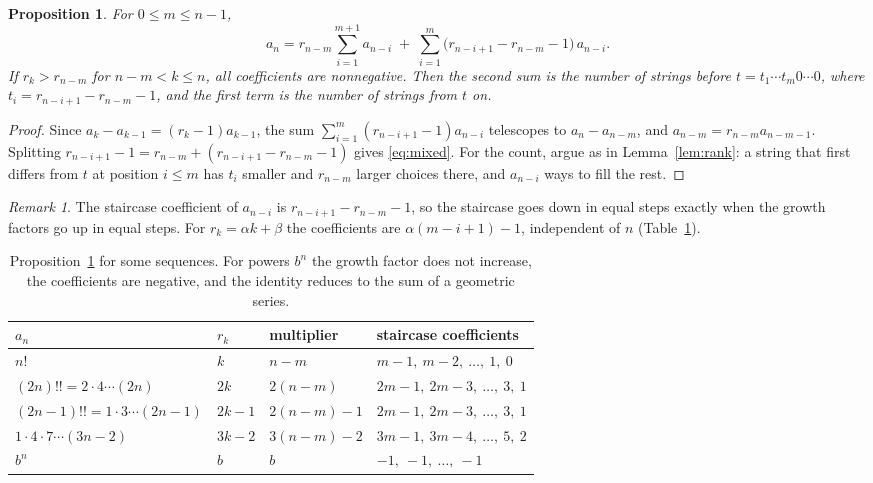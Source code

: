 \documentclass[11pt]{amsart}
\theoremstyle{plain}
\newtheorem{proposition}[theorem]{Proposition}
\theoremstyle{definition}
\theoremstyle{remark}
\newtheorem{remark}[theorem]{Remark}
\begin{document}
\begin{proposition}\label{thm:mixed}
For $0\le m\le n-1$,
\begin{equation}\label{eq:mixed}
  a_n=r_{n-m}\sum_{i=1}^{m+1}a_{n-i}\;+\;
  \sum_{i=1}^{m}\bigl(r_{n-i+1}-r_{n-m}-1\bigr)\,a_{n-i}.
\end{equation}
If $r_k>r_{n-m}$ for $n-m<k\le n$, all coefficients are nonnegative. Then the
second sum is the number of strings before $t=t_1\cdots t_m0\cdots0$, where
$t_i=r_{n-i+1}-r_{n-m}-1$, and the first term is the number of strings from
$t$ on.
\end{proposition}

\begin{proof}
Since $a_k-a_{k-1}=(r_k-1)a_{k-1}$, the sum
$\sum_{i=1}^{m}(r_{n-i+1}-1)a_{n-i}$ telescopes to $a_n-a_{n-m}$, and
$a_{n-m}=r_{n-m}a_{n-m-1}$. Splitting
$r_{n-i+1}-1=r_{n-m}+(r_{n-i+1}-r_{n-m}-1)$ gives \eqref{eq:mixed}. For the
count, argue as in Lemma~\ref{lem:rank}: a string that first differs from $t$
at position $i\le m$ has $t_i$ smaller and $r_{n-m}$ larger choices there, and
$a_{n-i}$ ways to fill the rest.
\end{proof}

\begin{remark}\label{cor:affine}
The staircase coefficient of $a_{n-i}$ is $r_{n-i+1}-r_{n-m}-1$, so the
staircase goes down in equal steps exactly when the growth factors go up in
equal steps. For $r_k=\alpha k+\beta$ the coefficients are
$\alpha(m-i+1)-1$, independent of $n$ (Table~\ref{tab:mixed}).
\end{remark}

\begin{table}[!ht]
\centering
\begin{tabular}{@{}llll@{}}
\toprule
$a_n$ & $r_k$ & multiplier & staircase coefficients\\
\midrule
$n!$ & $k$ & $n-m$ & $m-1,\ m-2,\ \dots,\ 1,\ 0$\\
$(2n)!!=2\cdot4\cdots(2n)$ & $2k$ & $2(n-m)$ & $2m-1,\ 2m-3,\ \dots,\ 3,\ 1$\\
$(2n-1)!!=1\cdot3\cdots(2n-1)$ & $2k-1$ & $2(n-m)-1$ & $2m-1,\ 2m-3,\ \dots,\ 3,\ 1$\\
$1\cdot4\cdot7\cdots(3n-2)$ & $3k-2$ & $3(n-m)-2$ & $3m-1,\ 3m-4,\ \dots,\ 5,\ 2$\\
$b^n$ & $b$ & $b$ & $-1,\ -1,\ \dots,\ -1$\\
\bottomrule
\end{tabular}
\caption{Proposition~\ref{thm:mixed} for some sequences. For powers $b^n$ the
growth factor does not increase, the coefficients are negative, and the
identity reduces to the sum of a geometric series.}
\label{tab:mixed}
\end{table}
\end{document}
